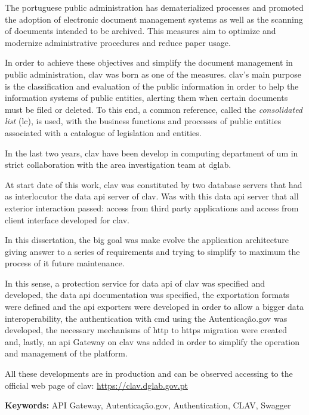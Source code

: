 The portuguese public administration has dematerialized processes and promoted the adoption of electronic document management systems as well as the scanning of documents intended to be archived. This measures aim to optimize and modernize administrative procedures and reduce paper usage.

In order to achieve these objectives and simplify the document management in public administration, \acrshort{clav} was born as one of the measures. \acrshort{clav}'s main purpose is the classification and evaluation of the public information in order to help the information systems of public entities, alerting them when certain documents must be filed or deleted. To this end, a common reference, called the \textit{consolidated list} (\acrlong{lc}), is used, with the business functions and processes of public entities associated with a catalogue of legislation and entities.

In the last two years, \acrshort{clav} have been develop in computing department of \acrshort{um} in strict collaboration with the area investigation team at \acrlong{dglab}.

At start date of this work, \acrshort{clav} was constituted by two database servers that had as interlocutor the data \acrshort{api} server of \acrshort{clav}. Was with this data \acrshort{api} server that all exterior interaction passed: access from third party applications and access from client interface developed for \acrshort{clav}.

In this dissertation, the big goal was make evolve the application architecture giving answer to a series of requirements and trying to simplify to maximum the process of it future maintenance.

In this sense, a protection service for data \acrshort{api} of \acrshort{clav} was specified and developed, the data \acrshort{api} documentation was specified, the exportation formats were defined and the \acrshort{api} exporters were developed in order to allow a bigger data interoperability, the authentication with \acrlong{cmd} using the Autenticação.gov was developed, the necessary mechanisms of \acrshort{http} to \acrshort{https} migration were created and, lastly, an \acrshort{api} Gateway on \acrshort{clav} was added in order to simplify the operation and management of the platform.

All these developments are in production and can be observed accessing to the official web page of \acrshort{clav}: \url{https://clav.dglab.gov.pt}

\vspace{1cm}

\textbf{Keywords:} API Gateway, Autenticação.gov, Authentication, CLAV, Swagger
